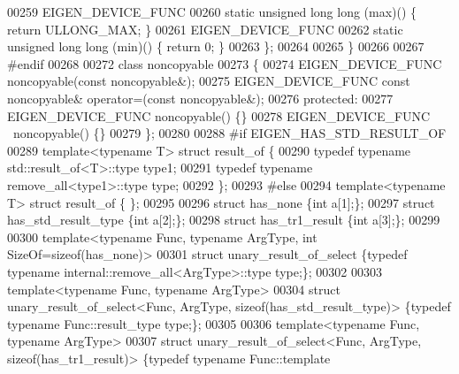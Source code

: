 \begin{DoxyCode}
00259   EIGEN\_DEVICE\_FUNC
00260   \textcolor{keyword}{static} \textcolor{keywordtype}{unsigned} \textcolor{keywordtype}{long} long (max)() \{ \textcolor{keywordflow}{return} ULLONG\_MAX; \}
00261   EIGEN\_DEVICE\_FUNC
00262   \textcolor{keyword}{static} \textcolor{keywordtype}{unsigned} \textcolor{keywordtype}{long} long (min)() \{ \textcolor{keywordflow}{return} 0; \}
00263 \};
00264 
00265 \}
00266 
00267 \textcolor{preprocessor}{#endif}
00268 
00272 \textcolor{keyword}{class }noncopyable
00273 \{
00274   EIGEN\_DEVICE\_FUNC noncopyable(\textcolor{keyword}{const} noncopyable&);
00275   EIGEN\_DEVICE\_FUNC \textcolor{keyword}{const} noncopyable& operator=(\textcolor{keyword}{const} noncopyable&);
00276 \textcolor{keyword}{protected}:
00277   EIGEN\_DEVICE\_FUNC noncopyable() \{\}
00278   EIGEN\_DEVICE\_FUNC ~noncopyable() \{\}
00279 \};
00280 
00288 \textcolor{preprocessor}{#if EIGEN\_HAS\_STD\_RESULT\_OF}
00289 \textcolor{keyword}{template}<\textcolor{keyword}{typename} T> \textcolor{keyword}{struct }result\_of \{
00290   \textcolor{keyword}{typedef} \textcolor{keyword}{typename} std::result\_of<T>::type type1;
00291   \textcolor{keyword}{typedef} \textcolor{keyword}{typename} remove\_all<type1>::type type;
00292 \};
00293 \textcolor{preprocessor}{#else}
00294 \textcolor{keyword}{template}<\textcolor{keyword}{typename} T> \textcolor{keyword}{struct }result\_of \{ \};
00295 
00296 \textcolor{keyword}{struct }has\_none \{\textcolor{keywordtype}{int} a[1];\};
00297 \textcolor{keyword}{struct }has\_std\_result\_type \{\textcolor{keywordtype}{int} a[2];\};
00298 \textcolor{keyword}{struct }has\_tr1\_result \{\textcolor{keywordtype}{int} a[3];\};
00299 
00300 \textcolor{keyword}{template}<\textcolor{keyword}{typename} Func, \textcolor{keyword}{typename} ArgType, \textcolor{keywordtype}{int} SizeOf=sizeof(has\_none)>
00301 \textcolor{keyword}{struct }unary\_result\_of\_select \{\textcolor{keyword}{typedef} \textcolor{keyword}{typename} internal::remove\_all<ArgType>::type type;\};
00302 
00303 \textcolor{keyword}{template}<\textcolor{keyword}{typename} Func, \textcolor{keyword}{typename} ArgType>
00304 \textcolor{keyword}{struct }unary\_result\_of\_select<Func, ArgType, sizeof(has\_std\_result\_type)> \{\textcolor{keyword}{typedef} \textcolor{keyword}{typename} 
      Func::result\_type type;\};
00305 
00306 \textcolor{keyword}{template}<\textcolor{keyword}{typename} Func, \textcolor{keyword}{typename} ArgType>
00307 \textcolor{keyword}{struct }unary\_result\_of\_select<Func, ArgType, sizeof(has\_tr1\_result)> \{\textcolor{keyword}{typedef} \textcolor{keyword}{typename} Func::template 

\end{DoxyCode}
